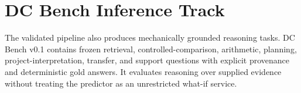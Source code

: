 \section{DC Bench Inference Track}
The validated pipeline also produces mechanically grounded reasoning tasks.
DC Bench v0.1 contains frozen retrieval, controlled-comparison, arithmetic,
planning, project-interpretation, transfer, and support questions with explicit
provenance and deterministic gold answers. It evaluates reasoning over supplied
evidence without treating the predictor as an unrestricted what-if service.
